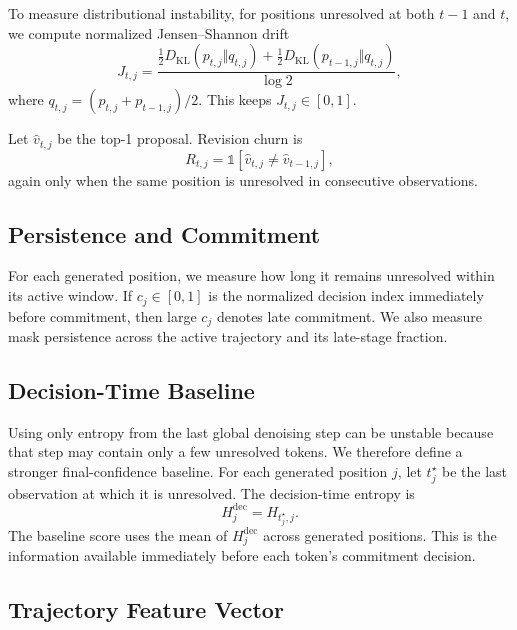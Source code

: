 \documentclass[10pt]{article}
\begin{document}
To measure distributional instability, for positions unresolved at both $t-1$ and $t$, we compute normalized Jensen--Shannon drift
\begin{equation}
J_{t,j} =
\frac{
\frac{1}{2}D_{\mathrm{KL}}(p_{t,j}\Vert q_{t,j})+
\frac{1}{2}D_{\mathrm{KL}}(p_{t-1,j}\Vert q_{t,j})
}{\log 2},
\end{equation}
where $q_{t,j}=(p_{t,j}+p_{t-1,j})/2$.
This keeps $J_{t,j}\in[0,1]$.

Let $\hat{v}_{t,j}$ be the top-1 proposal.
Revision churn is
\begin{equation}
R_{t,j}=\mathbb{1}[\hat{v}_{t,j}\neq\hat{v}_{t-1,j}],
\end{equation}
again only when the same position is unresolved in consecutive observations.

\subsection{Persistence and Commitment}

For each generated position, we measure how long it remains unresolved within its active window.
If $c_j\in[0,1]$ is the normalized decision index immediately before commitment, then large $c_j$ denotes late commitment.
We also measure mask persistence across the active trajectory and its late-stage fraction.

\subsection{Decision-Time Baseline}

Using only entropy from the last global denoising step can be unstable because that step may contain only a few unresolved tokens.
We therefore define a stronger final-confidence baseline.
For each generated position $j$, let $t_j^\star$ be the last observation at which it is unresolved.
The decision-time entropy is
\begin{equation}
H^{\mathrm{dec}}_j = H_{t_j^\star,j}.
\end{equation}
The baseline score uses the mean of $H^{\mathrm{dec}}_j$ across generated positions.
This is the information available immediately before each token's commitment decision.

\subsection{Trajectory Feature Vector}
\end{document}
